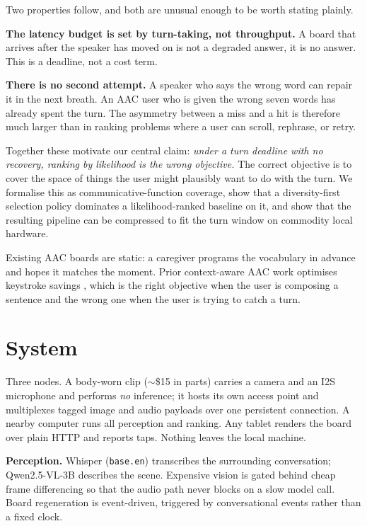 \documentclass{article}
\begin{document}
Two properties follow, and both are unusual enough to be worth stating plainly.

\textbf{The latency budget is set by turn-taking, not throughput.} A board that
arrives after the speaker has moved on is not a degraded answer, it is no answer.
This is a deadline, not a cost term.

\textbf{There is no second attempt.} A speaker who says the wrong word can
repair it in the next breath. An AAC user who is given the wrong seven words has
already spent the turn. The asymmetry between a miss and a hit is therefore much
larger than in ranking problems where a user can scroll, rephrase, or retry.

Together these motivate our central claim: \emph{under a turn deadline with no
recovery, ranking by likelihood is the wrong objective.} The correct objective
is to cover the space of things the user might plausibly want to do with the
turn. We formalise this as communicative-function coverage, show that a
diversity-first selection policy dominates a likelihood-ranked baseline on it,
and show that the resulting pipeline can be compressed to fit the turn window on
commodity local hardware.

Existing AAC boards are static: a caregiver programs the vocabulary in advance
and hopes it matches the moment. Prior context-aware AAC work optimises
keystroke savings \citep{kwickchat2022,praact2024}, which is the right objective
when the user is composing a sentence and the wrong one when the user is trying
to catch a turn.

\section{System}

Three nodes. A body-worn clip ($\sim$\$15 in parts) carries a camera and an I2S
microphone and performs \emph{no} inference; it hosts its own access point and
multiplexes tagged image and audio payloads over one persistent connection. A
nearby computer runs all perception and ranking. Any tablet renders the board
over plain HTTP and reports taps. Nothing leaves the local machine.

\textbf{Perception.} Whisper (\texttt{base.en}) transcribes the surrounding
conversation; Qwen2.5-VL-3B \citep{qwen25vl} describes the scene. Expensive
vision is gated behind cheap frame differencing so that the audio path never
blocks on a slow model call. Board regeneration is event-driven, triggered by
conversational events rather than a fixed clock.
\end{document}
